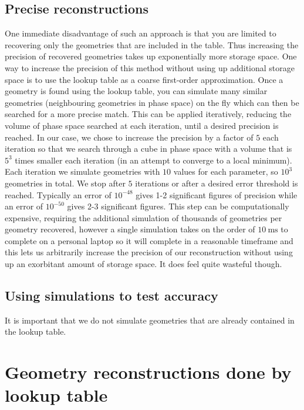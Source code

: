 \subsection{Precise reconstructions}

One immediate disadvantage of such an approach is that you are limited to recovering only the geometries that are included in the table. Thus increasing the precision of recovered geometries takes up exponentially more storage space. One way to increase the precision of this method without using up additional storage space is to use the lookup table as a coarse first-order approximation. Once a geometry is found using the lookup table, you can simulate many similar geometries (neighbouring geometries in phase space) on the fly which can then be searched for a more precise match. This can be applied iteratively, reducing the volume of phase space searched at each iteration, until a desired precision is reached. In our case, we chose to increase the precision by a factor of $5$ each iteration so that we search through a cube in phase space with a volume that is $5^3$ times smaller each iteration (in an attempt to converge to a local minimum). Each iteration we simulate geometries with $10$ values for each parameter, so $10^3$ geometries in total. We stop after $5$ iterations or after a desired error threshold is reached. Typically an error of $10^{-48}$ gives 1-2 significant figures of precision while an error of $10^{-50}$ gives 2-3 significant figures. This step can be computationally expensive, requiring the additional simulation of thousands of geometries per geometry recovered, however a single simulation takes on the order of $\SI{10}{\ms}$ to complete on a personal laptop so it will complete in a reasonable timeframe and this lets us arbitrarily increase the precision of our reconstruction without using up an exorbitant amount of storage space. It does feel quite wasteful though.

\subsection{Using simulations to test accuracy}
It is important that we do not simulate geometries that are already contained in the lookup table.


\section{Geometry reconstructions done by lookup table} \label{ssec:degenerateGeometries}


